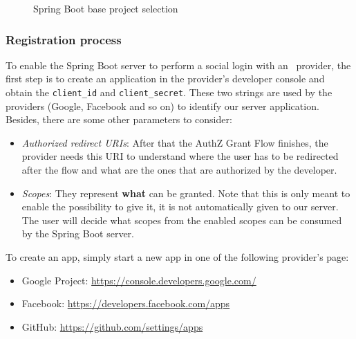\begin{figure}[h!]
    \centering
    \caption{Spring Boot base project selection}
    \label{fig:spring}
\end{figure}

\subsubsection{Registration process}
\label{regprocess}
To enable the Spring Boot server to perform a social login with an \oauth\ provider, the first step is to create an application in the provider's developer console and obtain the \texttt{client\_id} and \texttt{client\_secret}. These two strings are used by the providers (Google, Facebook and so on) to identify our server application. Besides, there are some other parameters to consider:

\begin{itemize}
    \item \textit{Authorized redirect URIs}: After that the AuthZ Grant Flow finishes, the provider needs this URI to understand where the user has to be redirected after the flow and what are the ones that are authorized by the developer.
    \item \textit{Scopes}: They represent \textbf{what} can be granted. Note that this is only meant to enable the possibility to give it, it is not automatically given to our server. The user will decide what scopes from the enabled scopes can be consumed by the Spring Boot server.
\end{itemize}

\noindent To create an app, simply start a new app in one of the following provider's page:

\begin{itemize}
    \item Google Project: \url{https://console.developers.google.com/}
    \item Facebook: \url{https://developers.facebook.com/apps}
    \item GitHub: \url{https://github.com/settings/apps}
\end{itemize}

